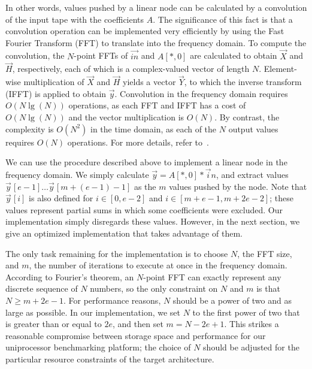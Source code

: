 In other words, values pushed by a linear node can be calculated by a
convolution of the input tape with the coefficients $A$.  The
significance of this fact is that a convolution operation can be
implemented very efficiently by using the Fast Fourier Transform (FFT)
to translate into the frequency domain.  To compute the convolution,
the $N$-point FFTs of $\vec{in}$ and $A[*,0]$ are calculated to obtain
$\vec{X}$ and $\vec{H}$, respectively, each of which is a
complex-valued vector of length $N$.  Element-wise multiplication of
$\vec{X}$ and $\vec{H}$ yields a vector $\vec{Y}$, to which the
inverse transform (IFFT) is applied to obtain $\vec{y}$.  Convolution
in the frequency domain requires $O(N \lg(N))$ operations, as each FFT
and IFFT has a cost of $O(N \lg (N))$ and the vector multiplication is
$O(N)$.  By contrast, the complexity is $O(N^2)$ in the time domain,
as each of the $N$ output values requires $O(N)$ operations.  For more
details, refer to~\cite{oppenheim-discrete}.

We can use the procedure described above to implement a linear node in
the frequency domain.  We simply calculate ${\vec y} = A[*,0] * {\vec
in}$, and extract values ${\vec y}\hspace{1pt}[e-1] \dots {\vec y}\hspace{1pt}[m+(e-1)-1]$ as
the $m$ values pushed by the node.  Note that ${\vec y}\hspace{1pt}[i]$ is also
defined for $i \in [0, e-2]$ and $i \in [m+e-1,m+2e-2]$; these values
represent partial sums in which some coefficients were excluded.  Our
{\naive} implementation simply disregards these values.  However, in the
next section, we give an optimized implementation that takes advantage
of them.

The only task remaining for the implementation is to choose $N$, the
FFT size, and $m$, the number of iterations to execute at once in the
frequency domain.  According to Fourier's theorem, an $N$-point FFT
can exactly represent any discrete sequence of $N$ numbers, so the
only constraint on $N$ and $m$ is that $N \ge m+2e-1$.  For
performance reasons, $N$ should be a power of two and as large as
possible.  In our implementation, we set $N$ to the first power of two
that is greater than or equal to $2e$, and then set $m = N-2e+1$.
This strikes a reasonable compromise between storage space and
performance for our uniprocessor benchmarking platform; the choice of
$N$ should be adjusted for the particular resource constraints of the
target architecture.

